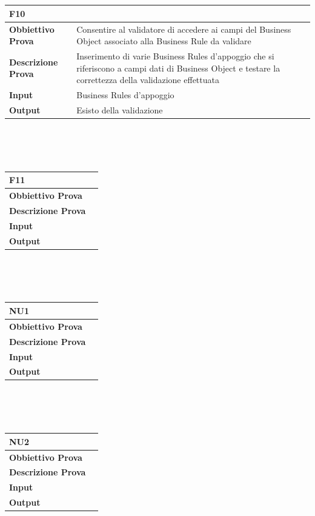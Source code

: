 \documentclass[11pt,titlepage,a4paper]{report}
\begin{document}
\\
\\
\begin{tabular}{||p{4.5cm}||p{7.5cm}||}
\hline
\textbf{\textsf{F10}} \\
\hline
{\textbf {Obbiettivo Prova}}& Consentire al validatore di accedere ai campi del Business Object associato alla Business Rule da validare \\ \hline
{\textbf{Descrizione Prova}}&  Inserimento di varie Business Rules d'appoggio che si riferiscono a campi dati di Business Object e testare la correttezza della validazione effettuata \\ \hline
{\textbf{Input}}&  Business Rules d'appoggio \\ \hline
{\textbf{Output}}& Esisto della validazione \\ \hline
\end{tabular} \\
\\
\\
\begin{tabular}{||p{4.5cm}||p{7.5cm}||}
\hline
\textbf{\textsf{F11}} \\
\hline
{\textbf {Obbiettivo Prova}}& \\ \hline
{\textbf{Descrizione Prova}}&  \\ \hline
{\textbf{Input}}&  \\ \hline
{\textbf{Output}}& \\ \hline
\end{tabular} \\
\\
\\
\begin{tabular}{||p{4.5cm}||p{7.5cm}||}
\hline
\textbf{\textsf{NU1}} \\
\hline
{\textbf {Obbiettivo Prova}}& \\ \hline
{\textbf{Descrizione Prova}}&  \\ \hline
{\textbf{Input}}&  \\ \hline
{\textbf{Output}}& \\ \hline
\end{tabular} \\
\\
\\
\begin{tabular}{||p{4.5cm}||p{7.5cm}||}
\hline
\textbf{\textsf{NU2}} \\
\hline
{\textbf {Obbiettivo Prova}}& \\ \hline
{\textbf{Descrizione Prova}}&  \\ \hline
{\textbf{Input}}&  \\ \hline
{\textbf{Output}}& \\ \hline
\end{tabular} \\
\end{document}
